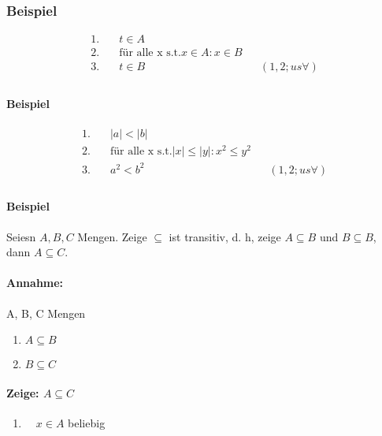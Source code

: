         \subsubsection{Beispiel}

            \begin{align*}
                1. &\quad t \in A                   && \\
                2. &\quad \text{für alle x s.t.} x \in A : x \in B                      && \\
                3. &\quad t \in B && (1, 2; us \forall)\\
            \end{align*}    

        \paragraph{Beispiel}

            \begin{align*}
                1. &\quad |a| < |b|                   && \\
                2. &\quad \text{für alle x s.t.} |x| \leq |y| : x^2 \leq y^2                      && \\
                3. &\quad a^2 < b^2 && (1, 2; us \forall)\\
            \end{align*}    

        \paragraph{Beispiel}
            Seiesn $A, B, C$ Mengen. Zeige $\subseteq$ ist transitiv, d. h, zeige $A \subseteq B$ und $B \subseteq B$, dann $A \subseteq C$.
            \paragraph*{Annahme: }
                A, B, C Mengen
                \begin{enumerate}
                    \item \(A \subseteq B\)
                    \item \(B \subseteq C\)
                \end{enumerate}
            \paragraph*{Zeige: \(A \subseteq C\)}
            \begin{enumerate}
                \item \(\quad  x \in A\) beliebig
            \end{enumerate}

